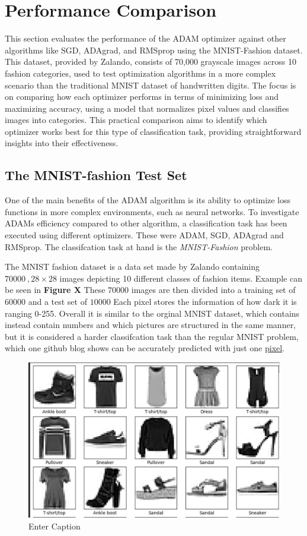 \documentclass[oneside]{article}
\begin{document}
\section{Performance Comparison}

This section evaluates the performance of the ADAM optimizer against other algorithms like SGD, ADAgrad, and RMSprop using the MNIST-Fashion dataset. This dataset, provided by Zalando, consists of 70,000 grayscale images across 10 fashion categories, used to test optimization algorithms in a more complex scenario than the traditional MNIST dataset of handwritten digits. The focus is on comparing how each optimizer performs in terms of minimizing loss and maximizing accuracy, using a model that normalizes pixel values and classifies images into categories. This practical comparison aims to identify which optimizer works best for this type of classification task, providing straightforward insights into their effectiveness.
\subsection{The MNIST-fashion Test Set}
One of the main benefits of the ADAM algorithm is its ability to optimize loss functions in more complex environments, such as neural networks. To investigate ADAMs efficiency compared to other algorithm, a classification task has been executed using different optimizers. These were ADAM, SGD, ADAgrad and RMSprop. The classifcation task at hand is the \textit{MNIST-Fashion} problem.\par

The MNIST fashion dataset is a data set made by Zalando containing $70 000 \ ,28 \times 28$ images depicting 10 different classes of fashion items. Example can be seen in \textbf{Figure X} These $70 000$ images are then divided into a training set of $60000$ and a test set of $10000$
Each pixel stores the information of how dark it is ranging 0-255. Overall it is similar to the orginal MNIST dataset, which contains instead contain numbers and which pictures are structured in the same manner, but it is considered a harder classifcation task than the regular MNIST problem, which one  github blog shows can be accurately predicted with just one \hyperlink{https://gist.github.com/dgrtwo/aaef94ecc6a60cd50322c0054cc04478}{pixel}. 

\begin{figure}[h!]
    \centering
    \includegraphics[width=0.42\linewidth]{report/figures/example_items.pdf}
    \caption{Enter Caption}
    \label{fig:enter-label}
\end{figure}
\end{document}
